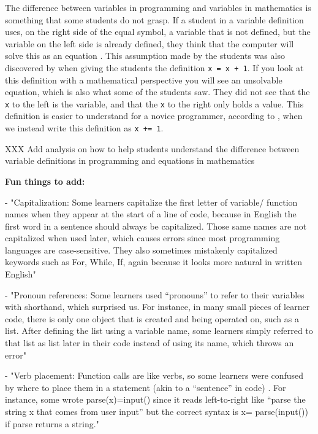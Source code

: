 The difference between variables in programming and variables in mathematics 
is something that some students do not grasp. If a student in a variable 
definition uses, on the right side of the equal symbol, a variable that is not 
defined, but the variable on the left side is already defined, they think that 
the computer will solve this as an equation \parencite{Plass2015Variables}. 
This assumption made by the students was also discovered by 
\textcite{Kohn2017VariableEvaluation} when giving the students the definition 
\verb'x = x + 1'. If you look at this definition with a mathematical 
perspective you will see an unsolvable equation, which is also what some of 
the 
students saw. They did not see that the \verb'x' to the left is the variable, 
and that the \verb'x' to the right only holds a value. This definition is  
easier to understand for a novice programmer, according to 
\textcite{Kohn2017VariableEvaluation}, when we instead write this definition 
as 
\verb'x += 1'. 

XXX Add analysis on how to help students understand the difference between 
variable definitions in programming and equations in mathematics

\textbf{Fun things to add:}

- "Capitalization: Some learners capitalize the first letter of variable/
function names when they appear at the start of a line of code, because in 
English the first word in a sentence should always be capitalized. Those same 
names are not capitalized when used later, which causes errors since most 
programming languages are case-sensitive. They also sometimes mistakenly 
capitalized keywords such as For, While, If, again because it looks more 
natural in written English" \parencite{GuoMarkelZhang2020}

- "Pronoun references: Some learners used “pronouns” to refer to their 
variables with shorthand, which surprised us. For instance, in many small 
pieces of learner code, there is only one object that is created and being 
operated on, such as a list. After defining the list using a variable name, 
some learners simply referred to that list as list later in their code 
instead of using its name, which throws an error" \parencite{
GuoMarkelZhang2020}

- "Verb placement: Function calls are like verbs, so some learners were 
confused by where to place them in a statement (akin to a “sentence” in code)
. For instance, some wrote parse(x)=input() since it reads left-to-right like 
“parse the string x that comes from user input” but the correct syntax is x=
parse(input()) if parse returns a string." \parencite{GuoMarkelZhang2020}


